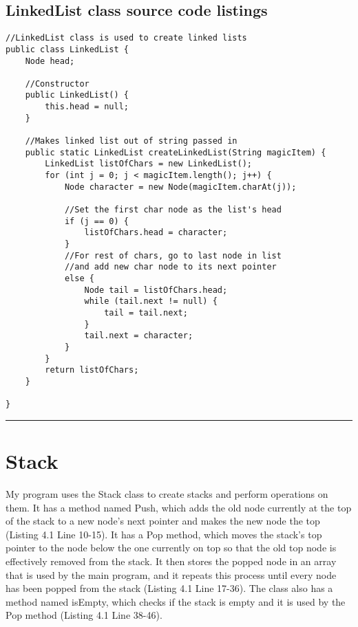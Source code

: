 \documentclass[letterpaper, 10pt,DIV=13]{scrartcl}
\numberwithin{equation}{section} %
\numberwithin{figure}{section} %
\numberwithin{table}{section} %
\newcommand{\horrule}[1]{\rule{\linewidth}{#1}} %
\begin{document}
\subsection{LinkedList class source code listings}
\lstset{numbers=left, numberstyle=\tiny, stepnumber=1, numbersep=5pt, basicstyle=\footnotesize\ttfamily}
\begin{lstlisting}[frame=single, ] 
//LinkedList class is used to create linked lists
public class LinkedList {
    Node head;

    //Constructor
    public LinkedList() {
        this.head = null;
    }

    //Makes linked list out of string passed in
    public static LinkedList createLinkedList(String magicItem) {
        LinkedList listOfChars = new LinkedList();
        for (int j = 0; j < magicItem.length(); j++) {
            Node character = new Node(magicItem.charAt(j));

            //Set the first char node as the list's head
            if (j == 0) {
                listOfChars.head = character;
            }
            //For rest of chars, go to last node in list 
            //and add new char node to its next pointer
            else {
                Node tail = listOfChars.head;
                while (tail.next != null) {
                    tail = tail.next;
                }
                tail.next = character;
            }
        }
        return listOfChars;
    }

}
\end{lstlisting}

\horrule{0pt}  	%

\section{Stack}\label{operations}
My program uses the Stack class to create stacks and perform operations on them. It has a method named Push, which adds the old node currently at the top of the stack to a new node's next pointer and makes the new node the top (Listing 4.1 Line 10-15). It has a Pop method, which moves the stack's top pointer to the node below the one currently on top so that the old top node is effectively removed from the stack. It then stores the popped node in an array that is used by the main program, and it repeats this process until every node has been popped from the stack (Listing 4.1 Line 17-36). The class also has a method named isEmpty, which checks if the stack is empty and it is used by the Pop method (Listing 4.1 Line 38-46).
\end{document}
